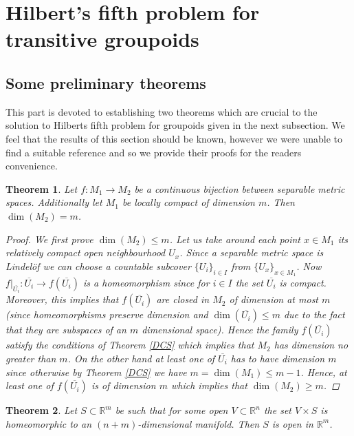 \documentclass[pdftex]{sigma}
\newtheorem{tw}{Theorem}[section]
\begin{document}
\section{Hilbert's fifth problem for transitive groupoids}
\subsection{Some preliminary theorems}
This part is devoted to establishing two theorems which are crucial to the solution to Hilberts fifth problem for groupoids given in the next subsection. We feel that the results of this section should be known, however we were unable to find a suitable reference and so we provide their proofs for the readers convenience.
\begin{tw}\label{dim} Let $f\colon M_1\rightarrow M_2$ be a continuous bijection between separable metric spaces. Additionally let $M_1$ be locally compact of dimension $m$. Then $\dim(M_2)=m$.
\begin{proof} We first prove $\dim(M_2)\leq m$. Let us take around each point $x\in M_1$ its relatively compact open neighbourhood $U_x$. Since a separable metric space is Lindel\"{o}f we can choose a countable subcover $\{U_i\}_{i\in I}$ from $\{U_x\}_{x\in M_1}$. Now $f|_{\overline{U_i}}\colon \overline{U_i}\rightarrow f(\overline{U_i})$ is a homeomorphism since for $i\in I$ the set $\overline{U_i}$ is compact. Moreover, this implies that $f(\overline{U_i})$ are closed in $M_2$ of dimension at most $m$ (since homeomorphisms preserve dimension and $\dim(\overline{U_i})\leq m$ due to the fact that they are subspaces of an $m$ dimensional space). Hence the family $f(\overline{U_i})$ satisfy the conditions of Theorem \ref{DCS} which implies that $M_2$ has dimension no greater than $m$. On the other hand at least one of $\overline{U_i}$ has to have dimension $m$ since otherwise by Theorem \ref{DCS} we have $m=\dim(M_1)\leq m-1$. Hence, at least one of $f(\overline{U_i})$ is of dimension $m$ which implies that $\dim(M_2)\geq m$.
\end{proof}
\end{tw}
\begin{tw}\label{Prod1} Let $S\subset\mathbb{R}^m$ be such that for some open $V\subset\mathbb{R}^n$ the set $V\times S$ is homeomorphic to an $(n+m)$-dimensional manifold. Then $S$ is open in $\mathbb{R}^m$.\end{tw}
\end{document}
